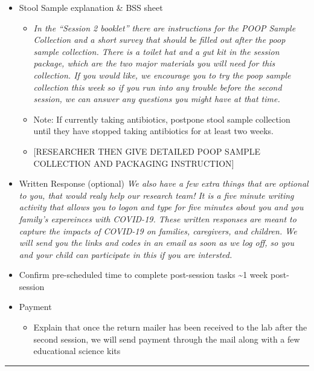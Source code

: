 \documentclass[
]{book}
\providecommand{\tightlist}{%
  \setlength{\itemsep}{0pt}\setlength{\parskip}{0pt}}
\begin{document}
\begin{itemize}
\tightlist
\item
  Stool Sample explanation \& BSS sheet

  \begin{itemize}
  \item
    \emph{In the ``Session 2 booklet'' there are instructions for the POOP Sample Collection and a short survey that should be filled out after the poop sample collection. There is a toilet hat and a gut kit in the session package, which are the two major materials you will need for this collection. If you would like, we encourage you to try the poop sample collection this week so if you run into any trouble before the second session, we can answer any questions you might have at that time.}
  \item
    Note: If currently taking antibiotics, postpone stool sample collection until they have stopped taking antibiotics for at least two weeks.
  \item
    {[}RESEARCHER THEN GIVE DETAILED POOP SAMPLE COLLECTION AND PACKAGING INSTRUCTION{]}
  \end{itemize}
\item
  Written Response (optional)
  \emph{We also have a few extra things that are optional to you, that would realy help our research team! It is a five minute writing activity that allows you to logon and type for five minutes about you and you family's expereinces with COVID-19. These written responses are meant to capture the impacts of COVID-19 on families, caregivers, and children. We will send you the links and codes in an email as soon as we log off, so you and your child can participate in this if you are intersted.}
\item
  Confirm pre-scheduled time to complete post-session tasks \textasciitilde1 week post-session
\item
  Payment

  \begin{itemize}
  \tightlist
  \item
    Explain that once the return mailer has been received to the lab after the second session, we will send payment through the mail along with a few educational science kits
  \end{itemize}
\end{itemize}

\begin{center}\rule{0.5\linewidth}{0.5pt}\end{center}
\end{document}
